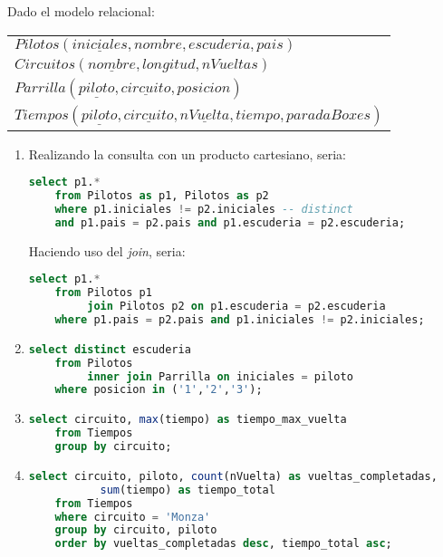 Dado el modelo relacional:
\begin{center}
	\begin{tabular}{l}
		$Pilotos(\underline{iniciales}, nombre, escuderia, pais)$\\
		$Circuitos(\underline{nombre}, longitud, nVueltas)$\\
		$Parrilla(\underline{piloto}, \underline{circuito}, posicion)$\\				$Tiempos(\underline{piloto}, \underline{circuito}, \underline{nVuelta}, tiempo, paradaBoxes)$\\
	\end{tabular}
\end{center}

\begin{enumerate}

	\item 
	Realizando la consulta con un producto cartesiano, seria:
	\begin{lstlisting}[language=sql]
	select p1.*
	from Pilotos as p1, Pilotos as p2
	where p1.iniciales != p2.iniciales -- distinct
	and p1.pais = p2.pais and p1.escuderia = p2.escuderia;\end{lstlisting}
	
	Haciendo uso del \textit{join}, seria:
	\begin{lstlisting}[language=sql]
	select p1.*
	from Pilotos p1 
	     join Pilotos p2 on p1.escuderia = p2.escuderia
	where p1.pais = p2.pais and p1.iniciales != p2.iniciales;\end{lstlisting}
	
	\item 
	\begin{lstlisting}[language=sql]
	select distinct escuderia
	from Pilotos 
	     inner join Parrilla on iniciales = piloto
	where posicion in ('1','2','3');\end{lstlisting}
	
	\item 
	\begin{lstlisting}[language=sql]
	select circuito, max(tiempo) as tiempo_max_vuelta
	from Tiempos
	group by circuito;\end{lstlisting}

	\newpage
	\item 
	\begin{lstlisting}[language=sql]
	select circuito, piloto, count(nVuelta) as vueltas_completadas, 
	       sum(tiempo) as tiempo_total
	from Tiempos
	where circuito = 'Monza'
	group by circuito, piloto
	order by vueltas_completadas desc, tiempo_total asc;\end{lstlisting}
	

\end{enumerate}
